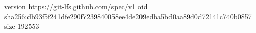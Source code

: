 version https://git-lfs.github.com/spec/v1
oid sha256:db93f5f241dfe290f7239840058ee4de209edba5bd0aa89d0d72141c740b0857
size 192553
